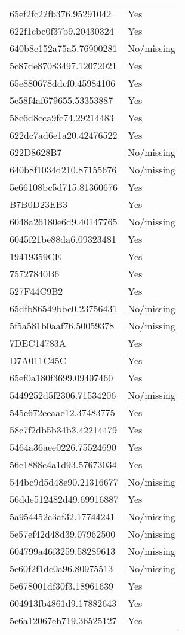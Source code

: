 \begin{tabular}{ll}
65ef2fc22fb376.95291042 & Yes \\
622f1cbc0f37b9.20430324 & Yes \\
640b8e152a75a5.76900281 & No/missing \\
5c87de87083497.12072021 & Yes \\
65e880678ddcf0.45984106 & Yes \\
5e58f4af679655.53353887 & Yes \\
58c6d8cca9fc74.29214483 & Yes \\
622dc7ad6e1a20.42476522 & Yes \\
622D8628B7 & No/missing \\
640b8f1034d210.87155676 & No/missing \\
5e66108bc5d715.81360676 & Yes \\
B7B0D23EB3 & Yes \\
6048a26180e6d9.40147765 & No/missing \\
6045f21be88da6.09323481 & Yes \\
19419359CE & Yes \\
75727840B6 & Yes \\
527F44C9B2 & Yes \\
65dfb86549bbc0.23756431 & No/missing \\
5f5a581b0aaf76.50059378 & No/missing \\
7DEC14783A & Yes \\
D7A011C45C & Yes \\
65ef0a180f3699.09407460 & Yes \\
5449252d5f2306.71534206 & No/missing \\
545e672eeaac12.37483775 & Yes \\
58c7f2db5b34b3.42214479 & Yes \\
5464a36aee0226.75524690 & Yes \\
56e1888c4a1d93.57673034 & Yes \\
544bc9d5d48e90.21316677 & No/missing \\
56dde512482d49.69916887 & Yes \\
5a954452c3af32.17744241 & No/missing \\
5e57ef42d48d39.07962500 & No/missing \\
604799a46f3259.58289613 & No/missing \\
5e60f2f1dc0a96.80975513 & No/missing \\
5e678001df30f3.18961639 & Yes \\
604913fb4861d9.17882643 & Yes \\
5e6a12067eb719.36525127 & Yes \\

\end{tabular}
